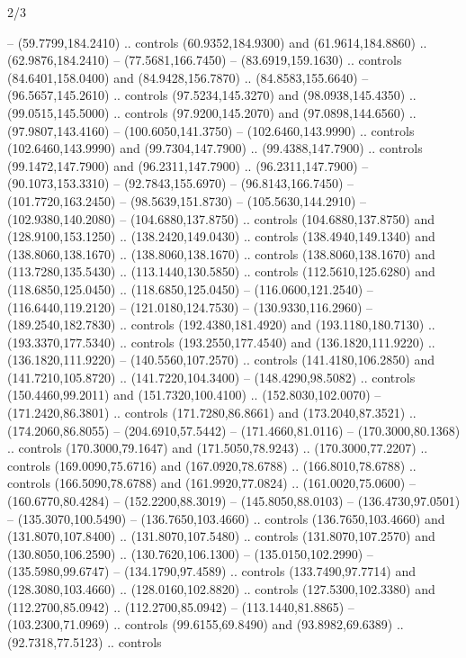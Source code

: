 \begin{flagdescription}{2/3}
\begin{scope}[scale=\flagwidth/600]
\begin{scope}[y=-1pt, x=1pt,yshift=600]
  -- (59.7799,184.2410) .. controls (60.9352,184.9300) and (61.9614,184.8860) ..
  (62.9876,184.2410) -- (77.5681,166.7450) -- (83.6919,159.1630) .. controls
  (84.6401,158.0400) and (84.9428,156.7870) .. (84.8583,155.6640) --
  (96.5657,145.2610) .. controls (97.5234,145.3270) and (98.0938,145.4350) ..
  (99.0515,145.5000) .. controls (97.9200,145.2070) and (97.0898,144.6560) ..
  (97.9807,143.4160) -- (100.6050,141.3750) -- (102.6460,143.9990) .. controls
  (102.6460,143.9990) and (99.7304,147.7900) .. (99.4388,147.7900) .. controls
  (99.1472,147.7900) and (96.2311,147.7900) .. (96.2311,147.7900) --
  (90.1073,153.3310) -- (92.7843,155.6970) -- (96.8143,166.7450) --
  (101.7720,163.2450) -- (98.5639,151.8730) -- (105.5630,144.2910) --
  (102.9380,140.2080) -- (104.6880,137.8750) .. controls (104.6880,137.8750) and
  (128.9100,153.1250) .. (138.2420,149.0430) .. controls (138.4940,149.1340) and
  (138.8060,138.1670) .. (138.8060,138.1670) .. controls (138.8060,138.1670) and
  (113.7280,135.5430) .. (113.1440,130.5850) .. controls (112.5610,125.6280) and
  (118.6850,125.0450) .. (118.6850,125.0450) -- (116.0600,121.2540) --
  (116.6440,119.2120) -- (121.0180,124.7530) -- (130.9330,116.2960) --
  (189.2540,182.7830) .. controls (192.4380,181.4920) and (193.1180,180.7130) ..
  (193.3370,177.5340) .. controls (193.2550,177.4540) and (136.1820,111.9220) ..
  (136.1820,111.9220) -- (140.5560,107.2570) .. controls (141.4180,106.2850) and
  (141.7210,105.8720) .. (141.7220,104.3400) -- (148.4290,98.5082) .. controls
  (150.4460,99.2011) and (151.7320,100.4100) .. (152.8030,102.0070) --
  (171.2420,86.3801) .. controls (171.7280,86.8661) and (173.2040,87.3521) ..
  (174.2060,86.8055) -- (204.6910,57.5442) -- (171.4660,81.0116) --
  (170.3000,80.1368) .. controls (170.3000,79.1647) and (171.5050,78.9243) ..
  (170.3000,77.2207) .. controls (169.0090,75.6716) and (167.0920,78.6788) ..
  (166.8010,78.6788) .. controls (166.5090,78.6788) and (161.9920,77.0824) ..
  (161.0020,75.0600) -- (160.6770,80.4284) -- (152.2200,88.3019) --
  (145.8050,88.0103) -- (136.4730,97.0501) -- (135.3070,100.5490) --
  (136.7650,103.4660) .. controls (136.7650,103.4660) and (131.8070,107.8400) ..
  (131.8070,107.5480) .. controls (131.8070,107.2570) and (130.8050,106.2590) ..
  (130.7620,106.1300) -- (135.0150,102.2990) -- (135.5980,99.6747) --
  (134.1790,97.4589) .. controls (133.7490,97.7714) and (128.3080,103.4660) ..
  (128.0160,102.8820) .. controls (127.5300,102.3380) and (112.2700,85.0942) ..
  (112.2700,85.0942) -- (113.1440,81.8865) -- (103.2300,71.0969) .. controls
  (99.6155,69.8490) and (93.8982,69.6389) .. (92.7318,77.5123) .. controls

\end{scope}
\end{scope}
\end{flagdescription}
